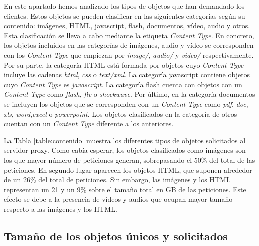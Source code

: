\documentclass[twocolumn]{Jornadas}
\begin{document}
En este apartado hemos analizado los tipos de objetos que han demandado los clientes.
Estos objetos se pueden clasificar en las siguientes categorías según su contenido: imágenes, HTML, javascript, flash, documentos, vídeo, audio y otros.
Esta clasificación se lleva a cabo mediante la etiqueta \emph{Content Type}. En concreto, los objetos incluidos en las categorías de imágenes, audio y vídeo se corresponden con los \emph{Content Type} que empiezan por \textit{image/}, \textit{audio/} y \textit{video/} respectivamente.
Por su parte, la categoría HTML está formada por objetos cuyo \emph{Content Type} incluye las cadenas \textit{html}, \textit{css} o \textit{text/xml}.
La categoría javascript contiene objetos cuyo \emph{Content Type} es \textit{javascript}. La categoría flash cuenta con objetos con un \emph{Content Type} como \textit{flash}, \textit{flv} o \textit{shockwave}. Por último, en la categoría documentos se incluyen los objetos que se corresponden con un \emph{Content Type} como \textit{pdf}, \textit{doc}, \textit{xls}, \textit{word},\textit{excel} o \textit{powerpoint}. Los objetos clasificados en la categoría de otros cuentan con un \emph{Content Type} diferente a los anteriores.

La Tabla \ref{table:contenido} muestra los diferentes tipos de objetos solicitados al servidor proxy. Como cabía esperar, los objetos clasificados como imágenes son los que mayor número de peticiones generan, sobrepasando el 50\% del total de las peticiones. En segundo lugar aparecen los objetos HTML, que suponen alrededor de un 26\% del total de peticiones. Sin embargo, las imágenes y los HTML representan un 21 y un 9\% sobre el tamaño total en GB de las peticiones. Este efecto se debe a la presencia de vídeos y audios que ocupan mayor tamaño respecto a las imágenes y los HTML.   

\subsection{Tamaño de los objetos únicos y solicitados}
\label{unicos_solicitados}
\end{document}
